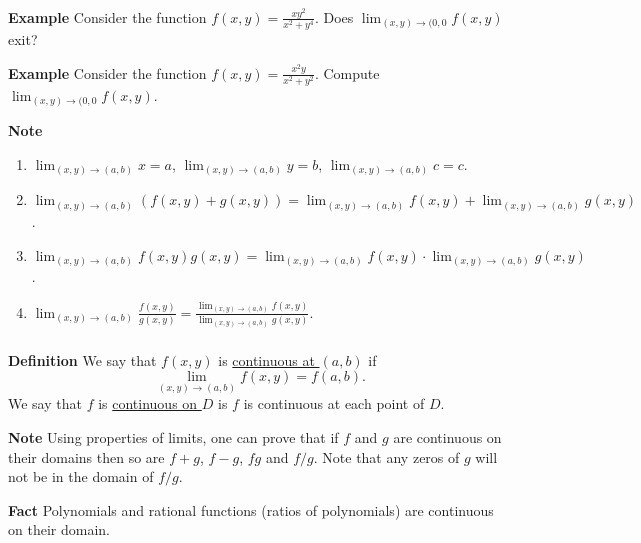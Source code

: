 \begin{frame}[fragile]\frametitle{}
 
\textbf{Example}
Consider the function $f(x,y)=\frac{xy^2}{x^2+y^4}$.  Does $\lim_{(x,y)\rightarrow (0,0} f(x,y)$ exit?
 

\textbf{Example}
Consider the function $f(x,y)=\frac{x^2y}{x^2+y^2}$.  Compute $\lim_{(x,y)\rightarrow (0,0} f(x,y)$.
 

\textbf{Note} 
\begin{enumerate}
\item $\lim_{(x,y)\rightarrow (a,b)} x = a$,  $\lim_{(x,y)\rightarrow (a,b)} y = b$, $\lim_{(x,y)\rightarrow (a,b)} c = c$.  
\item $\lim_{(x,y)\rightarrow (a,b)} (f(x,y)+g(x,y)) = \lim_{(x,y)\rightarrow (a,b)} f(x,y) + \lim_{(x,y)\rightarrow (a,b)} g(x,y)$. 
\item $\lim_{(x,y)\rightarrow (a,b)} f(x,y)g(x,y) = \lim_{(x,y)\rightarrow (a,b)} f(x,y) \cdot \lim_{(x,y)\rightarrow (a,b)} g(x,y)$. 
\item $\lim_{(x,y)\rightarrow (a,b)} \frac{f(x,y)}{g(x,y)} = \frac{\lim_{(x,y)\rightarrow (a,b)} f(x,y)}{\lim_{(x,y)\rightarrow (a,b)} g(x,y)}$.
\end{enumerate}

\end{frame}



\begin{frame}[fragile]\frametitle{}
 
\textbf{Definition}
We say that $f(x,y)$ is \underline{continuous at $(a,b)$} if 
$$
\lim_{(x,y)\rightarrow (a,b)} f(x,y) = f(a,b).
$$  
We say that $f$ is \underline{continuous on $D$} is $f$ is continuous at each point of $D$.
  

\textbf{Note}
Using properties of limits, one can prove that if $f$ and $g$ are continuous on their domains then so are $f+g$, $f-g$, $fg$ and $f/g$.  Note that any zeros of $g$ will not be in the domain of $f/g$.
 

\textbf{Fact}
Polynomials and rational functions (ratios of polynomials) are continuous on their domain.

\end{frame}



